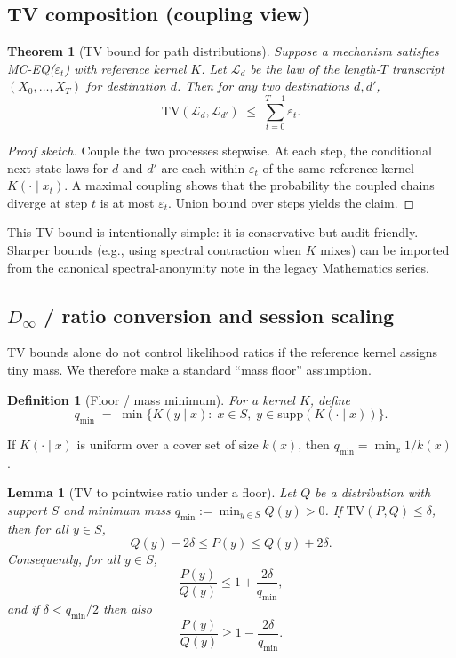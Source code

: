 \documentclass[11pt]{article}
\newtheorem{definition}{Definition}
\newtheorem{lemma}{Lemma}
\newtheorem{theorem}{Theorem}
\newcommand{\TV}{\mathrm{TV}}
\newcommand{\eps}{\varepsilon}
\begin{document}
\subsection{TV composition (coupling view)}
\begin{theorem}[TV bound for path distributions]
Suppose a mechanism satisfies MC-EQ($\eps_t$) with reference kernel $K$.
Let $\mathcal{L}_d$ be the law of the length-$T$ transcript $(X_0,\dots,X_T)$ for destination $d$.
Then for any two destinations $d,d'$,
\[
\TV(\mathcal{L}_d,\mathcal{L}_{d'})\;\le\; \sum_{t=0}^{T-1} \eps_t.
\]
\end{theorem}
\begin{proof}[Proof sketch]
Couple the two processes stepwise.
At each step, the conditional next-state laws for $d$ and $d'$ are each within $\eps_t$ of the same reference kernel $K(\cdot\mid x_t)$.
A maximal coupling shows that the probability the coupled chains diverge at step $t$ is at most $\eps_t$.
Union bound over steps yields the claim.
\end{proof}

This TV bound is intentionally simple: it is conservative but audit-friendly.
Sharper bounds (e.g., using spectral contraction when $K$ mixes) can be imported from the canonical spectral-anonymity note in the legacy Mathematics series.

\subsection{$D_\infty$ / ratio conversion and session scaling}
\label{sec:linfty}
TV bounds alone do not control likelihood ratios if the reference kernel assigns tiny mass.
We therefore make a standard ``mass floor'' assumption.

\begin{definition}[Floor / mass minimum]
For a kernel $K$, define
\[
q_{\min}\;=\;\min\{K(y\mid x):\; x\in S,\; y\in \mathrm{supp}(K(\cdot\mid x))\}.
\]
\end{definition}
If $K(\cdot\mid x)$ is uniform over a cover set of size $k(x)$, then $q_{\min}=\min_x 1/k(x)$.

\begin{lemma}[TV to pointwise ratio under a floor]
\label{lem:tv-to-ratio}
Let $Q$ be a distribution with support $S$ and minimum mass $q_{\min}:=\min_{y\in S}Q(y)>0$.
If $\TV(P,Q)\le \delta$, then for all $y\in S$,
\[
Q(y)-2\delta \le P(y) \le Q(y)+2\delta.
\]
Consequently, for all $y\in S$,
\[
\frac{P(y)}{Q(y)}\le 1+\frac{2\delta}{q_{\min}},
\]
and if $\delta<q_{\min}/2$ then also
\[
\frac{P(y)}{Q(y)}\ge 1-\frac{2\delta}{q_{\min}}.
\]
\end{lemma}
\end{document}
